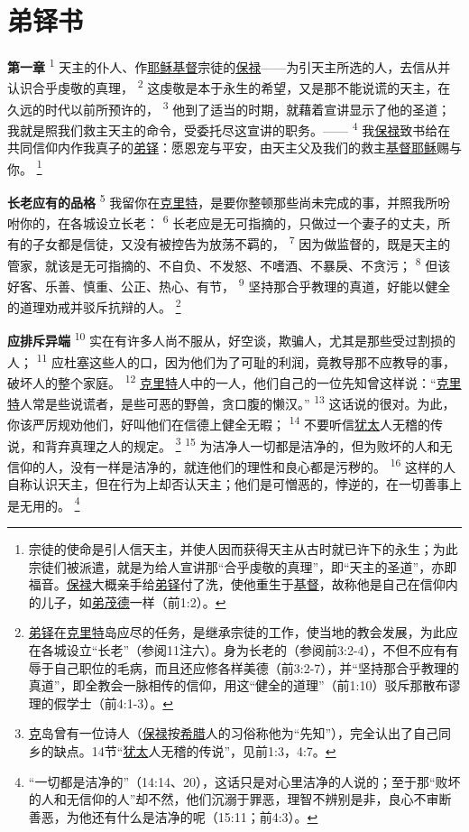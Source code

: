 \chapter*{弟铎书}


\textbf{第一章\quad}
\textsuperscript{1}
天主的仆人、作\uline{耶稣}\uline{基督}宗徒的\uline{保禄}——为引天主所选的人，去信从并认识合乎虔敬的真理，
\textsuperscript{2}
这虔敬是本于永生的希望，又是那不能说谎的天主，在久远的时代以前所预许的，
\textsuperscript{3}
他到了适当的时期，就藉着宣讲显示了他的圣道；我就是照我们救主天主的命令，受委托尽这宣讲的职务。——
\textsuperscript{4}
我\uline{保禄}致书给在共同信仰内作我真子的\uline{弟铎}：愿恩宠与平安，由天主父及我们的救主\uline{基督}\uline{耶稣}赐与你。
\renewcommand\thefootnote{\ding{\numexpr171+\value{footnote}}}
\footnote{宗徒的使命是引人信天主，并使人因而获得天主从古时就已许下的永生；为此宗徒们被派遣，就是为给人宣讲那“合乎虔敬的真理”，即“天主的圣道”，亦即福音。\uline{保禄}大概亲手给\uline{弟铎}付了洗，使他重生于\uline{基督}，故称他是自己在信仰内的儿子，如\uline{弟茂德}一样（前1:2）。}

\textbf{长老应有的品格\quad}
\textsuperscript{5}
我留你在\uline{克里特}，是要你整顿那些尚未完成的事，并照我所吩咐你的，在各城设立长老：
\textsuperscript{6}
长老应是无可指摘的，只做过一个妻子的丈夫，所有的子女都是信徒，又没有被控告为放荡不羁的，
\textsuperscript{7}
因为做监督的，既是天主的管家，就该是无可指摘的、不自负、不发怒、不嗜酒、不暴戾、不贪污；
\textsuperscript{8}
但该好客、乐善、慎重、公正、热心、有节，
\textsuperscript{9}
坚持那合乎教理的真道，好能以健全的道理劝戒并驳斥抗辩的人。
\footnote{\uline{弟铎}在\uline{克里特}岛应尽的任务，是继承宗徒的工作，使当地的教会发展，为此应在各城设立“长老”（参阅11注六）。身为长老的（参阅前3:2-4），不但不应有有辱于自己职位的毛病，而且还应修各样美德（前3:2-7），并“坚持那合乎教理的真道”，即全教会一脉相传的信仰，用这“健全的道理”（前1:10）驳斥那散布谬理的假学士（前4:1-3）。}

\textbf{应排斥异端\quad}
\textsuperscript{10}
实在有许多人尚不服从，好空谈，欺骗人，尤其是那些受过割损的人；
\textsuperscript{11}
应杜塞这些人的口，因为他们为了可耻的利润，竟教导那不应教导的事，破坏人的整个家庭。
\textsuperscript{12}
\uline{克里特}人中的一人，他们自己的一位先知曾这样说：“\uline{克里特}人常是些说谎者，是些可恶的野兽，贪口腹的懒汉。”
\textsuperscript{13}
这话说的很对。为此，你该严厉规劝他们，好叫他们在信德上健全无暇；
\textsuperscript{14}
不要听信\uline{犹太}人无稽的传说，和背弃真理之人的规定。
\footnote{\uline{克}岛曾有一位诗人（\uline{保禄}按\uline{希腊}人的习俗称他为“先知”），完全认出了自己同乡的缺点。14节“\uline{犹太}人无稽的传说”，见前1:3，4:7。}
\textsuperscript{15}
为洁净人一切都是洁净的，但为败坏的人和无信仰的人，没有一样是洁净的，就连他们的理性和良心都是污秽的。
\textsuperscript{16}
这样的人自称认识天主，但在行为上却否认天主；他们是可憎恶的，悖逆的，在一切善事上是无用的。
\footnote{“一切都是洁净的”（14:14、20），这话只是对心里洁净的人说的；至于那“败坏的人和无信仰的人”却不然，他们沉溺于罪恶，理智不辨别是非，良心不审断善恶，为他还有什么是洁净的呢（15:11；前4:3）。}

